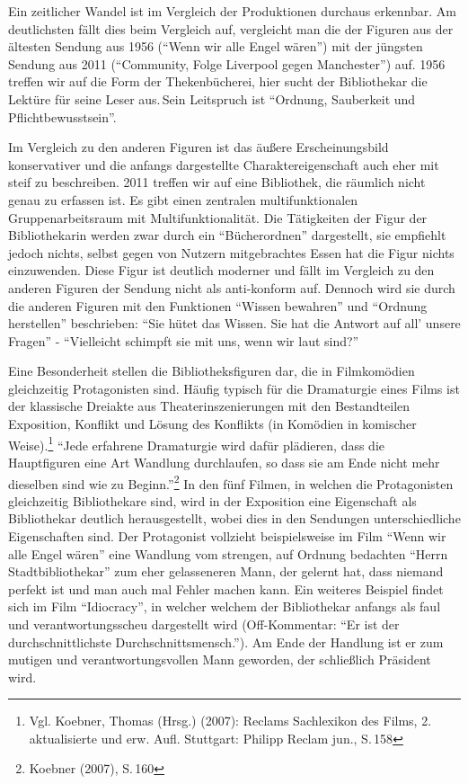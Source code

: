 
Ein zeitlicher Wandel ist im Vergleich der Produktionen durchaus
erkennbar. Am deutlichsten fällt dies beim Vergleich auf, vergleicht man
die der Figuren aus der ältesten Sendung aus 1956 (\enquote{Wenn wir
alle Engel wären}) mit der jüngsten Sendung aus 2011
(\enquote{Community, Folge Liverpool gegen Manchester}) auf. 1956
treffen wir auf die Form der Thekenbücherei, hier sucht der Bibliothekar
die Lektüre für seine Leser aus.\,Sein Leitspruch ist \enquote{Ordnung,
Sauberkeit und Pflichtbewusstsein}.

Im Vergleich zu den anderen Figuren ist das äußere Erscheinungsbild
konservativer und die anfangs dargestellte Charaktereigenschaft auch
eher mit steif zu beschreiben. 2011 treffen wir auf eine
Bibliothek, die räumlich nicht genau zu erfassen ist. Es gibt einen
zentralen multifunktionalen Gruppenarbeitsraum mit Multifunktionalität.
Die Tätigkeiten der Figur der Bibliothekarin werden zwar durch ein
\enquote{Bücherordnen} dargestellt, sie empfiehlt jedoch nichts, selbst
gegen von Nutzern mitgebrachtes Essen hat die Figur nichts einzuwenden.
Diese Figur ist deutlich moderner und fällt im Vergleich zu den anderen
Figuren der Sendung nicht als anti-konform auf. Dennoch wird
sie durch die anderen Figuren mit den Funktionen \enquote{Wissen
bewahren} und \enquote{Ordnung herstellen} beschrieben: \enquote{Sie
hütet das Wissen. Sie hat die Antwort auf all' unsere Fragen} -
\enquote{Vielleicht schimpft sie mit uns, wenn wir laut sind?}

Eine Besonderheit stellen die Bibliotheksfiguren dar, die in
Filmkomödien gleichzeitig Protagonisten sind. Häufig typisch für die
Dramaturgie eines Films ist der klassische Dreiakte aus
Theaterinszenierungen mit den Bestandteilen Exposition, Konflikt und
Lösung des Konflikts (in Komödien in komischer Weise).\footnote{Vgl.
  Koebner, Thomas (Hrsg.) (2007): Reclams Sachlexikon des Films, 2.
  aktualisierte und erw. Aufl. Stuttgart: Philipp Reclam jun., S.\,158}
\enquote{Jede erfahrene Dramaturgie wird dafür plädieren, dass die
Hauptfiguren eine Art Wandlung durchlaufen, so dass sie am Ende nicht
mehr dieselben sind wie zu Beginn.}\footnote{Koebner (2007), S.\,160} In
den fünf Filmen, in welchen die Protagonisten gleichzeitig Bibliothekare
sind, wird in der Exposition eine Eigenschaft als Bibliothekar deutlich
herausgestellt, wobei dies in den Sendungen unterschiedliche
Eigenschaften sind. Der Protagonist vollzieht beispielsweise im Film
\enquote{Wenn wir alle Engel wären} eine Wandlung vom strengen, auf
Ordnung bedachten \enquote{Herrn Stadtbibliothekar} zum eher
gelasseneren Mann, der gelernt hat, dass niemand perfekt ist und man
auch mal Fehler machen kann. Ein weiteres Beispiel findet sich im Film
\enquote{Idiocracy}, in welcher welchem der Bibliothekar anfangs als
faul und verantwortungsscheu dargestellt wird (Off-Kommentar:
\enquote{Er ist der durchschnittlichste Durchschnittsmensch.}). Am Ende
der Handlung ist er zum mutigen und verantwortungsvollen Mann geworden,
der schließlich Präsident wird.

